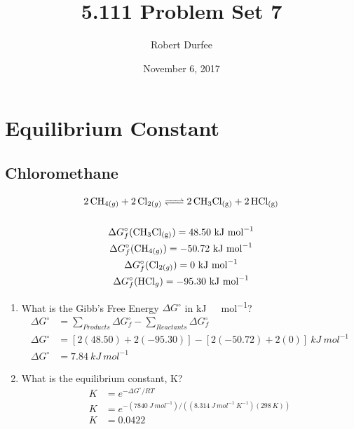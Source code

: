 \documentclass{article}
\title{5.111 Problem Set 7}
\author{Robert Durfee}
\date{November 6, 2017}
\begin{document}
\maketitle

\section{Equilibrium Constant}

\subsection{Chloromethane}
\begin{gather*}
    \ce{2CH_{4(g)} + 2Cl_{2(g)} <=> 2CH_3Cl_{(g)} + 2HCl_{(g)}}\\\\
    \Delta G^{\circ}_{f}(\ce{CH_{3}Cl_{(g)}}) = 48.50\ \si{kJ\ mol^{-1}}\\
    \Delta G^{\circ}_{f}(\ce{CH_{4(g)}}) = -50.72\ \si{kJ\ mol^{-1}}\\
    \Delta G^{\circ}_{f}(\ce{Cl_{2(g)}}) = 0\ \si{kJ\ mol^{-1}}\\
    \Delta G^{\circ}_{f}(\ce{HCl_{g}}) = -95.30\ \si{kJ\ mol^{-1}}
\end{gather*}

\begin{enumerate}
    \item What is the Gibb's Free Energy $\Delta G^{\circ}$ in \si{kJ\ mol^{-1}}?
    \begin{align*}
        \Delta G^{\circ}&=\sum\limits_{Products}\Delta G^{\circ}_{f} - \sum\limits_{Reactants} \Delta G^{\circ}_{f}\\
        \Delta G^{\circ}&=\left[2(48.50)+2(-95.30)\right]-\left[2(-50.72)+2(0)\right]\ \si{kJ\ mol^{-1}}\\
        \Delta G^{\circ}&=7.84\ \si{kJ\ mol^{-1}}
    \end{align*}
    \item What is the equilibrium constant, K?
    \begin{align*}
        K &= e^{-\Delta G^{\circ}/RT}\\
        K &= e^{-(7840\ \si{J\ mol^{-1}})/((8.314\ \si{J\ mol^{-1}}\ K^{-1})(298\ \si{K}))}\\
        K &= 0.0422
    \end{align*}
    
\end{enumerate}
\end{document}
